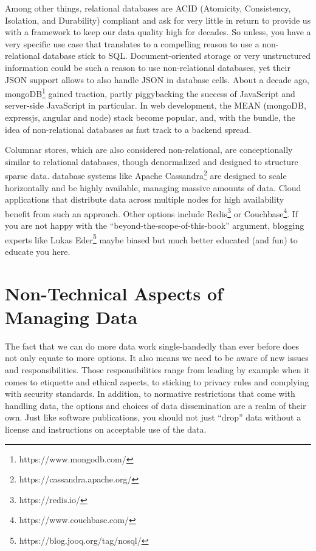 \documentclass[
  12pt,
  letterpaper,
]{krantz}
\begin{document}
Among other things, relational databases are ACID
(Atomicity, Consistency, Isolation, and Durability) compliant and ask
for very little in return to provide us with a framework to keep our
data quality high for decades. So unless, you have a very specific use
case that translates to a compelling reason to use a non-relational
database stick to SQL. Document-oriented storage or very
unstructured information could be such a reason to use non-relational
databases, yet their JSON support allows to also handle
JSON in database cells. About a decade ago,
mongoDB\footnote{https://www.mongodb.com/} gained traction, partly
piggybacking the success of JavaScript and server-side JavaScript in
particular. In web development, the MEAN (mongoDB, expressjs, angular
and node) stack become popular, and, with the bundle, the
idea of non-relational databases as fast track to a
backend spread.

Columnar stores, which are also considered non-relational, are
conceptionally similar to relational databases, though
denormalized and designed to structure sparse data.
database systems like Apache Cassandra\footnote{https://cassandra.apache.org/}
are designed to scale horizontally and be highly available, managing
massive amounts of data. Cloud applications that distribute data across
multiple nodes for high availability benefit from such an approach.
Other options include Redis\footnote{https://redis.io/} or
Couchbase\footnote{https://www.couchbase.com/}. If you are not happy
with the ``beyond-the-scope-of-this-book'' argument, blogging experts
like Lukas Eder\footnote{https://blog.jooq.org/tag/nosql/} maybe biased
but much better educated (and fun) to educate you here.

\hypertarget{non-technical-aspects-of-managing-data}{%
\section{Non-Technical Aspects of Managing
Data}\label{non-technical-aspects-of-managing-data}}

The fact that we can do more data work single-handedly than ever before
does not only equate to more options. It also means we need to be aware
of new issues and responsibilities. Those responsibilities range from
leading by example when it comes to etiquette and ethical aspects, to
sticking to privacy rules and complying with security standards. In
addition, to normative restrictions that come with handling data, the
options and choices of data dissemination are a realm of their own. Just
like software publications, you should not just ``drop'' data without a
license and instructions on acceptable use of the data.
\end{document}
